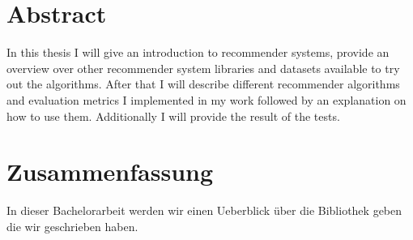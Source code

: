 \begingroup
\let\clearpage\relax
\let\cleardoublepage\relax
\let\cleardoublepage\relax

\chapter*{Abstract}
In this thesis I will give an introduction to recommender systems,
provide an overview over other recommender system libraries and
datasets available to try out the algorithms. After that I will
describe different recommender algorithms and evaluation metrics
I implemented in my work followed by an explanation on how to use them.
Additionally I will provide the result of the tests.


\vfill

\chapter*{Zusammenfassung}
In dieser Bachelorarbeit werden wir einen Ueberblick über die Bibliothek geben
die wir geschrieben haben.


\endgroup			

\vfill

\cleardoublepage
